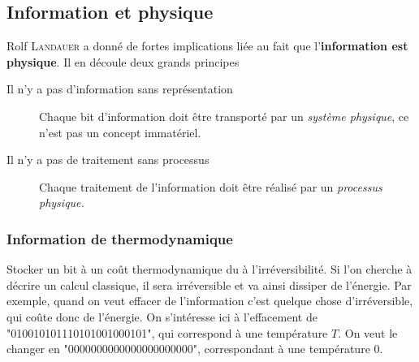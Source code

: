 \subsection{Information et physique}
Rolf \textsc{Landauer} a donné de fortes implications liée au fait que l'\textbf{information
est physique}. Il en découle deux grands principes
\begin{description}
\item[Il n'y a pas d'information sans représentation] Chaque bit d'information doit être
transporté par un \textit{système physique}, ce n'est pas un concept immatériel.
\item[Il n'y a pas de traitement sans processus] Chaque traitement de l'information doit
être réalisé par un \textit{processus physique.}
\end{description}

\subsubsection{Information de thermodynamique}
Stocker un bit à un coût thermodynamique du à l'irréversibilité. Si l'on cherche à décrire
un calcul classique, il sera irréversible et va ainsi dissiper de l'énergie. Par exemple, 
quand on veut effacer de l'information c'est quelque chose d'irréversible, qui coûte donc
de l'énergie. On s'intéresse ici à l'effacement de "010010101110101001000101", qui correspond 
à une température $T$. On veut le changer en "0000000000000000000000", correspondant à une
température 0.\\

